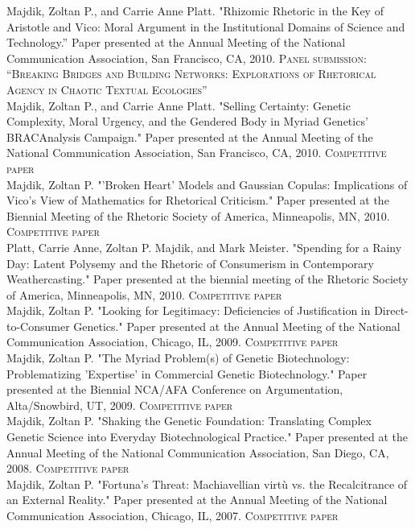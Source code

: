 \documentclass[10pt, a4paper]{article}
\newcommand{\years}[1]{\marginnote{\scriptsize #1}}
\begin{document}
\years{2010}Majdik, Zoltan P., and Carrie Anne Platt. "Rhizomic Rhetoric
in the Key of Aristotle and Vico: Moral Argument in the Institutional Domains
of Science and Technology.” Paper presented at the Annual Meeting of the
National Communication Association, San Francisco, CA, 2010. \textsc{Panel
    submission:
“Breaking Bridges and Building Networks: Explorations of Rhetorical Agency in
Chaotic Textual Ecologies”}\\
\years{2010}Majdik, Zoltan P., and Carrie Anne Platt. "Selling Certainty:
Genetic Complexity, Moral Urgency, and the Gendered Body in Myriad Genetics'
BRACAnalysis Campaign." Paper presented at the Annual Meeting of the National
Communication Association, San Francisco, CA, 2010. \textsc{Competitive paper}\\
\years{2010}Majdik, Zoltan P. "'Broken Heart' Models and Gaussian
Copulas: Implications of Vico's View of Mathematics for Rhetorical Criticism."
Paper presented at the Biennial Meeting of the Rhetoric Society of America,
Minneapolis, MN, 2010. \textsc{Competitive paper}\\
\years{2010}Platt, Carrie Anne, Zoltan P. Majdik, and Mark Meister.
"Spending for a Rainy Day: Latent Polysemy and the Rhetoric of Consumerism in
Contemporary Weathercasting." Paper presented at the biennial meeting of the
Rhetoric Society of America, Minneapolis, MN, 2010. \textsc{Competitive paper}\\
\years{2009}Majdik, Zoltan P. "Looking for Legitimacy: Deficiencies of
Justification in Direct-to-Consumer Genetics." Paper presented at the Annual
Meeting of the National Communication Association, Chicago, IL, 2009. \textsc{Competitive
paper}\\
\years{2009}Majdik, Zoltan P. "The Myriad Problem(s) of Genetic
Biotechnology: Problematizing 'Expertise' in Commercial Genetic Biotechnology."
Paper presented at the Biennial NCA/AFA Conference on Argumentation,
Alta/Snowbird, UT, 2009. \textsc{Competitive paper}\\
\years{2008}Majdik, Zoltan P. "Shaking the Genetic Foundation:
Translating Complex Genetic Science into Everyday Biotechnological Practice."
Paper presented at the Annual Meeting of the National Communication
Association, San Diego, CA, 2008. \textsc{Competitive paper}\\
\years{2007}Majdik, Zoltan P. "Fortuna's Threat: Machiavellian virtù vs.
the Recalcitrance of an External Reality." Paper presented at the Annual
Meeting of the National Communication Association, Chicago, IL, 2007. \textsc{Competitive
paper}\\
\end{document}

